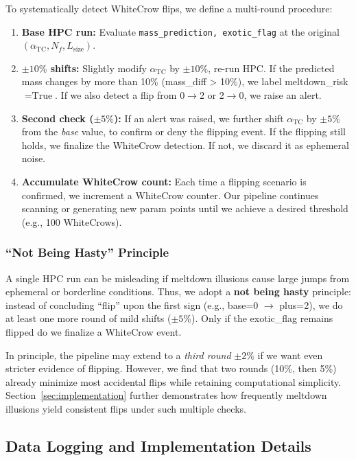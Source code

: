 \documentclass[11pt]{article}
\begin{document}
To systematically detect WhiteCrow flips, we define a multi-round procedure:
\begin{enumerate}
\item \textbf{Base HPC run:} Evaluate \texttt{mass\_prediction, exotic\_flag} at
      the original $(\alpha_{\mathrm{TC}}, N_f, L_{\mathrm{size}})$.
\item \textbf{$\pm 10\%$ shifts:} Slightly modify $\alpha_{\mathrm{TC}}$ by $\pm 10\%$,
      re-run HPC. If the predicted mass changes by more than 10\% 
      (mass\_diff > 10\%), we label meltdown\_risk $= \text{True}$.
      If we also detect a flip from 0$\to$2 or 2$\to$0, we raise an alert.
\item \textbf{Second check ($\pm 5\%$):} If an alert was raised,
      we further shift $\alpha_{\mathrm{TC}}$ by $\pm 5\%$ 
      from the \textit{base} value, to confirm or deny the flipping event.
      If the flipping still holds, we finalize the WhiteCrow detection.
      If not, we discard it as ephemeral noise.
\item \textbf{Accumulate WhiteCrow count:} Each time a flipping scenario
      is confirmed, we increment a WhiteCrow counter.
      Our pipeline continues scanning or generating new param points
      until we achieve a desired threshold (e.g., 100 WhiteCrows).
\end{enumerate}

\subsubsection{``Not Being Hasty'' Principle}

A single HPC run can be misleading if meltdown illusions
cause large jumps from ephemeral or borderline conditions.
Thus, we adopt a \textbf{not being hasty} principle:
instead of concluding ``flip'' upon the first sign (e.g., base=0 $\rightarrow$ plus=2),
we do at least one more round of mild shifts ($\pm 5\%$).
Only if the exotic\_flag remains flipped do we finalize a WhiteCrow event.

In principle, the pipeline may extend to a \textit{third round} $\pm 2\%$
if we want even stricter evidence of flipping. However, we find that
two rounds (10\%, then 5\%) already minimize most accidental flips
while retaining computational simplicity. Section~\ref{sec:implementation} further demonstrates how frequently meltdown illusions yield consistent flips under such multiple checks.


\subsection{Data Logging and Implementation Details}
\end{document}
